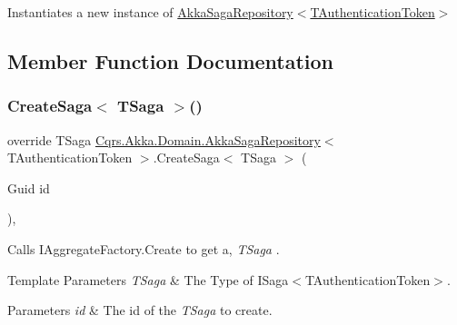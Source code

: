 Instantiates a new instance of \hyperlink{classCqrs_1_1Akka_1_1Domain_1_1AkkaSagaRepository_a8297f64e2b7a7be7bcc999c89dcece05_a8297f64e2b7a7be7bcc999c89dcece05}{Akka\+Saga\+Repository$<$\+T\+Authentication\+Token$>$} 



\subsection{Member Function Documentation}
\mbox{\label{classCqrs_1_1Akka_1_1Domain_1_1AkkaSagaRepository_a2c7263d0e58d2b31149ec685d5be934a_a2c7263d0e58d2b31149ec685d5be934a}} 
\subsubsection{\texorpdfstring{Create\+Saga$<$ T\+Saga $>$()}{CreateSaga< TSaga >()}}
{\footnotesize\ttfamily override T\+Saga \hyperlink{classCqrs_1_1Akka_1_1Domain_1_1AkkaSagaRepository}{Cqrs.\+Akka.\+Domain.\+Akka\+Saga\+Repository}$<$ T\+Authentication\+Token $>$.Create\+Saga$<$ T\+Saga $>$ (\begin{DoxyParamCaption}\item[{Guid}]{id }\end{DoxyParamCaption})\hspace{0.3cm}{\ttfamily [protected]}, {\ttfamily [virtual]}}



Calls I\+Aggregate\+Factory.\+Create to get a, {\itshape T\+Saga} . 


\begin{DoxyTemplParams}{Template Parameters}
{\em T\+Saga} & The Type of I\+Saga$<$\+T\+Authentication\+Token$>$.\\
\hline
\end{DoxyTemplParams}

\begin{DoxyParams}{Parameters}
{\em id} & The id of the {\itshape T\+Saga}  to create.\\
\hline
\end{DoxyParams}


